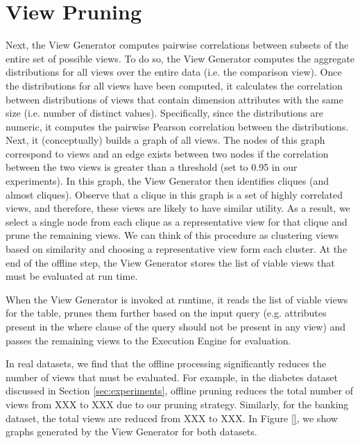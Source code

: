 \section{View Pruning}
\label{sec:view_pruning}
Next, the View Generator computes pairwise correlations between subsets of the
entire set of possible views.
To do so, the View Generator computes the aggregate distributions for all views
over the entire data (i.e. the comparison view). 
Once the distributions for all views have been computed, it calculates the
correlation between distributions of views that contain dimension attributes
with the same size (i.e. number of distinct values).
Specifically, since the distributions are numeric, it computes the pairwise
Pearson correlation between the distributions.
Next, it (conceptually) builds a graph of all views. 
The nodes of this graph correspond to views and an edge exists between two nodes
if the correlation between the two views is greater than a threshold (set to 0.95 in
our experiments). 
In this graph, the View Generator then identifies cliques (and almost cliques).
Observe that a clique in this graph is a set of highly correlated views,
and therefore, these views are likely to have similar utility. 
As a result, we select a
single node from each clique as a representative view for that clique and
prune the remaining views. 
We can think of this procedure as clustering views based on similarity and
choosing a representative view form each cluster.
At the end of the offline step, the View Generator stores the list of
viable views that must be evaluated at run time.

When the View Generator is invoked at runtime, it reads the list of viable
views for the table, prunes them further based on the input query (e.g.
attributes present in the where clause of the query should not be present in
any view) and passes the remaining views to the Execution Engine for
evaluation.

In real datasets, we find that the offline processing significantly
reduces the number of views that must be evaluated. 
For example, in the
diabetes dataset discussed in Section \ref{sec:experiments}, offline pruning
reduces the total number of views from XXX to XXX due to our pruning
strategy. Similarly, for the banking dataset, the total views are
reduced from XXX to XXX. In Figure \ref{}, we show graphs generated by the
View Generator for both datasets.